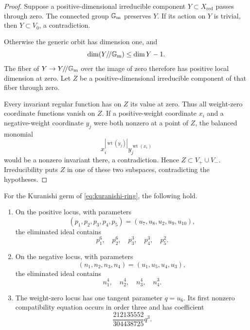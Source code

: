 \documentclass[11pt,reqno]{amsart}
\begin{document}
\begin{proof}
Suppose a positive-dimensional irreducible component
\(Y\subset X_{\mathrm{red}}\) passes through zero.  The connected group
\(\mathbb G_{\mathrm m}\) preserves \(Y\).  If its action on \(Y\) is trivial, then
\(Y\subset V_0\), a contradiction.

Otherwise the generic orbit has dimension one, and
\[
\dim(Y/\!/\mathbb G_{\mathrm m})\le\dim Y-1.
\]
The fiber of \(Y\to Y/\!/\mathbb G_{\mathrm m}\) over the image of zero therefore has positive
local dimension at zero.  Let \(Z\) be a positive-dimensional irreducible
component of that fiber through zero.

Every invariant regular function has on \(Z\) its value at zero.  Thus all
weight-zero coordinate functions vanish on \(Z\).  If a positive-weight
coordinate \(x_i\) and a negative-weight coordinate \(y_j\) were both
nonzero at a point of \(Z\), the balanced monomial
\[
x_i^{|\operatorname{wt}(y_j)|}
y_j^{\operatorname{wt}(x_i)}
\]
would be a nonzero invariant there, a contradiction.  Hence
\(Z\subset V_+\cup V_-\).  Irreducibility puts \(Z\) in one of these two
subspaces, contradicting the hypotheses.
\end{proof}

\begin{proposition}
\label{prop:pure-weight}
For the Kuranishi germ of \eqref{eq:kuranishi-ring}, the following hold.
\begin{enumerate}[label=(\roman*)]
\item On the positive locus, with parameters
\[
(p_1,p_2,p_3,p_4,p_5)=(u_7,u_8,u_2,u_9,u_{10}),
\]
the eliminated ideal contains
\[
p_1^6,\quad p_2^6,\quad p_3^3,\quad p_4^3,\quad p_5^2.
\]
\item On the negative locus, with parameters
\[
(n_1,n_2,n_3,n_4)=(u_1,u_5,u_4,u_3),
\]
the eliminated ideal contains
\[
n_1^4,\quad n_2^4,\quad n_3^4,\quad n_4^3.
\]
\item The weight-zero locus has one tangent parameter \(q=u_6\).  Its first
nonzero compatibility equation occurs in order three and has coefficient
\[
\frac{212135552}{304438725}q^3.
\]
\end{enumerate}
\end{proposition}
\end{document}
